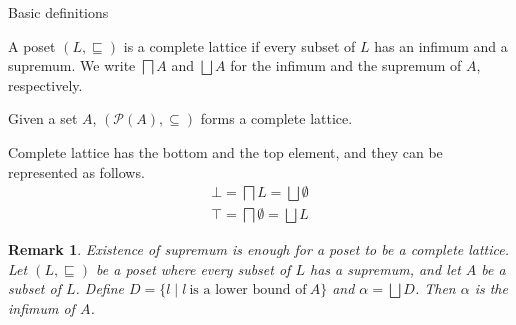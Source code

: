 \documentclass[9pt]{beamer}
\newcommand\pow[1]{\mathcal{P}(#1)}
\newtheorem{remark}{Remark}
\begin{document}
\begin{frame}{Basic definitions}
  \begin{definition}
    A poset $(L, \sqsubseteq)$ is a complete lattice if
    every subset of $L$ has an infimum and a supremum.
    We write $\bigsqcap A$ and $\bigsqcup A$ for the infimum and the supremum of $A$, respectively.
  \end{definition}

  \begin{example}
    Given a set $A$, $(\pow{A}, \subseteq)$ forms a complete lattice.
  \end{example}

  \begin{lemma}
    Complete lattice has the bottom and the top element, and they can be represented as follows.
    $$
      \begin{aligned}
        \bot = \bigsqcap L         = \bigsqcup \emptyset \\
        \top = \bigsqcap \emptyset = \bigsqcup L
      \end{aligned}
    $$
  \end{lemma}

  \begin{remark}
    Existence of supremum is enough for a poset to be a complete lattice.
    Let $(L, \sqsubseteq)$ be a poset where every subset of $L$ has a supremum, and let $A$ be a subset of $L$.
    Define $D = \{l \mid l \ \text{is a lower bound of} \ A \}$ and $\alpha = \bigsqcup D$.
    Then $\alpha$ is the infimum of $A$.
  \end{remark}
\end{frame}
\end{document}
